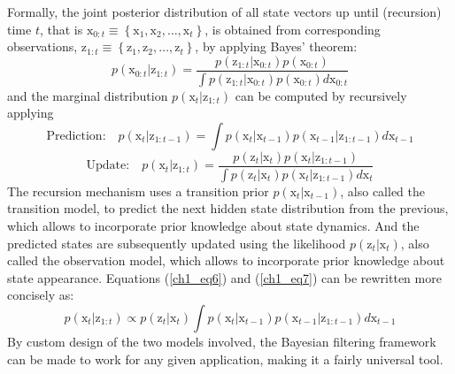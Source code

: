 Formally, the joint posterior distribution of all state vectors up until (recursion) time $t$, that is $\mathrm{x}_{0:t} \equiv \left\lbrace \mathrm{x}_1, \mathrm{x}_2, \dots, \mathrm{x}_t \right\rbrace $, is obtained from corresponding observations, $\mathrm{z}_{1:t} \equiv \left\lbrace \mathrm{z}_1, \mathrm{z}_2, \dots, \mathrm{z}_t \right\rbrace $, by applying Bayes' theorem:
\begin{equation}
p(\mathrm{x}_{0:t} | \mathrm{z}_{1:t}) = \frac{p(\mathrm{z}_{1:t} | \mathrm{x}_{0:t}) p(\mathrm{x}_{0:t})}{\int p(\mathrm{z}_{1:t} | \mathrm{x}_{0:t}) p(\mathrm{x}_{0:t}) d\mathrm{x}_{0:t} }
\label{ch1_eq5}
\end{equation}
and the marginal distribution $ p(\mathrm{x}_t | \mathrm{z}_{1:t}) $ can be computed by recursively applying
\begin{equation}
\textrm{Prediction:} \quad p(\mathrm{x}_t | \mathrm{z}_{1:t-1}) = \int\! p(\mathrm{x}_t | \mathrm{x}_{t-1}) p(\mathrm{x}_{t-1} | \mathrm{z}_{1:t-1}) d\mathrm{x}_{t-1}
\label{ch1_eq6}
\end{equation}
\begin{equation}
\textrm{Update:} \quad p(\mathrm{x}_t | \mathrm{z}_{1:t}) = \frac{p(\mathrm{z}_t | \mathrm{x}_t) p(\mathrm{x}_t | \mathrm{z}_{1:t-1})}{ \int p(\mathrm{z}_t | \mathrm{x}_t) p(\mathrm{x}_t | \mathrm{z}_{1:t-1}) d\mathrm{x}_t}
\label{ch1_eq7}
\end{equation} 
The recursion mechanism uses a transition prior $ p(\mathrm{x}_t | \mathrm{x}_{t-1}) $, also called the transition model, to predict the next hidden state distribution from the previous, which allows to incorporate prior knowledge about state dynamics. And the predicted states are subsequently updated using the likelihood $ p(\mathrm{z}_t | \mathrm{x}_t) $, also called the observation model, which allows to incorporate prior knowledge about state appearance. Equations (\ref{ch1_eq6}) and (\ref{ch1_eq7}) can be rewritten more concisely as:
\begin{equation}
p(\mathrm{x}_t | \mathrm{z}_{1:t}) \propto p(\mathrm{z}_t | \mathrm{x}_t) \!\int\! p(\mathrm{x}_t | \mathrm{x}_{t-1}) p(\mathrm{x}_{t-1} | \mathrm{z}_{1:t-1}) d\mathrm{x}_{t-1}
\label{ch1_eq8}
\end{equation}
By custom design of the two models involved, the Bayesian filtering framework can be made to work for any given application, making it a fairly universal tool.

